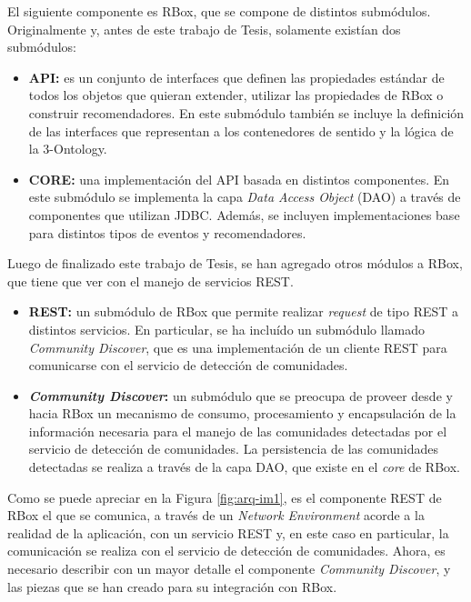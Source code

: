 El siguiente componente es RBox, que se compone de distintos submódulos. Originalmente y, antes de este trabajo de Tesis, solamente existían dos submódulos:

\begin{itemize}
  \item \textbf{API:} es un conjunto de interfaces que definen las propiedades estándar de todos los objetos que quieran extender, utilizar las propiedades de RBox o construir recomendadores. En este submódulo también se incluye la definición de las interfaces que representan a los contenedores de sentido y la lógica de la 3-Ontology.
  \item \textbf{CORE:} una implementación del API basada en distintos componentes. En este submódulo se implementa la capa \textit{Data Access Object} (DAO) a través de componentes que utilizan JDBC. Además, se incluyen implementaciones base para distintos tipos de eventos y recomendadores.
\end{itemize}

Luego de finalizado este trabajo de Tesis, se han agregado otros módulos a RBox, que tiene que ver con el manejo de servicios REST.

\begin{itemize}
  \item \textbf{REST:} un submódulo de RBox que permite realizar \textit{request} de tipo REST a distintos servicios. En particular, se ha incluído un submódulo llamado \textit{Community Discover}, que es una implementación de un cliente REST para comunicarse con el servicio de detección de comunidades.
  \item \textbf{\textit{Community Discover}:} un submódulo que se preocupa de proveer desde y hacia RBox un mecanismo de consumo, procesamiento y encapsulación de la información necesaria para el manejo de las comunidades detectadas por el servicio de detección de comunidades. La persistencia de las comunidades detectadas se realiza a través de la capa DAO, que existe en el \textit{core} de RBox.
\end{itemize}

Como se puede apreciar en la Figura \ref{fig:arq-im1}, es el componente REST de RBox el que se comunica, a través de un \textit{Network Environment} acorde a la realidad de la aplicación, con un servicio REST y, en este caso en particular, la comunicación se realiza con el servicio de detección de comunidades.  Ahora, es necesario describir con un mayor detalle el componente \textit{Community Discover}, y las piezas que se han creado para su integración con RBox.

